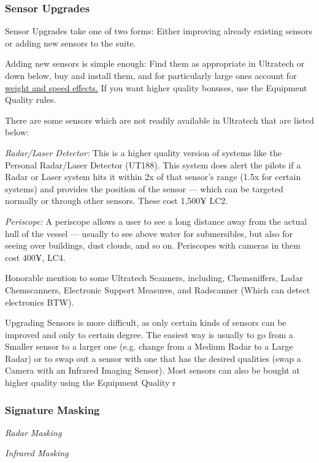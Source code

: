 \begin{multicols*}{2}
	\subsubsection{Sensor Upgrades}
	
	Sensor Upgrades take one of two forms: Either improving already existing sensors or adding new sensors to the suite.
	
	Adding new sensors is simple enough: Find them as appropriate in Ultratech or down below, buy and install them, and for particularly large ones account for \hyperref[weight_and_speed]{weight and speed effects.} If you want higher quality bonuses, use the Equipment Quality rules.
	
	There are some sensors which are not readily available in Ultratech that are listed below:
	
	\textit{Radar/Laser Detector:} This is a higher quality version of systems like the Personal Radar/Laser Detector (UT188). This system does alert the pilots if a Radar or Laser system hits it within 2x of that sensor's range (1.5x for certain systems) and provides the position of the sensor — which can be targeted normally or through other sensors. These cost 1,500¥ LC2.
	
	\textit{Periscope:} A periscope allows a user to see a long distance away from the actual hull of the vessel — usually to see above water for submersibles, but also for seeing over buildings, dust clouds, and so on. Periscopes with cameras in them cost 400¥, LC4.
	
	Honorable mention to some Ultratech Scanners, including, Chemsniffers, Ladar Chemscanners, Electronic Support Measures, and Radscanner (Which can detect electronics BTW).
	
	Upgrading Sensors is more difficult, as only certain kinds of sensors can be improved and only to certain degree. The easiest way is usually to go from a Smaller sensor to a larger one (e.g. change from a Medium Radar to a Large Radar) or to swap out a sensor with one that has the desired qualities (swap a Camera with an Infrared Imaging Sensor). Most sensors can also be bought at higher quality using the Equipment Quality r
	
	\subsubsection{Signature Masking}
	
	\textit{Radar Masking}
	
	\textit{Infrared Masking}
	

\end{multicols*}
